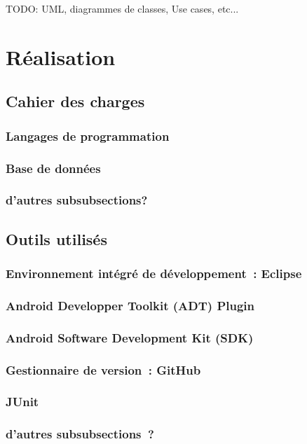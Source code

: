 \documentclass[a4paper,11pt,french]{article}
\begin{document}
TODO: UML, diagrammes de classes, Use cases, etc...


\section{Réalisation}
\subsection{Cahier des charges}




\subsubsection{Langages de programmation}



\subsubsection{Base de données}



\subsubsection{d'autres subsubsections?}

\subsection{Outils utilisés}
\subsubsection{Environnement intégré de développement~: Eclipse}
\subsubsection{Android Developper Toolkit (ADT) Plugin}
\subsubsection{Android Software Development Kit (SDK)}
\subsubsection{Gestionnaire de version~: GitHub}
\subsubsection{JUnit}
\subsubsection{d'autres subsubsections~?}
\end{document}
